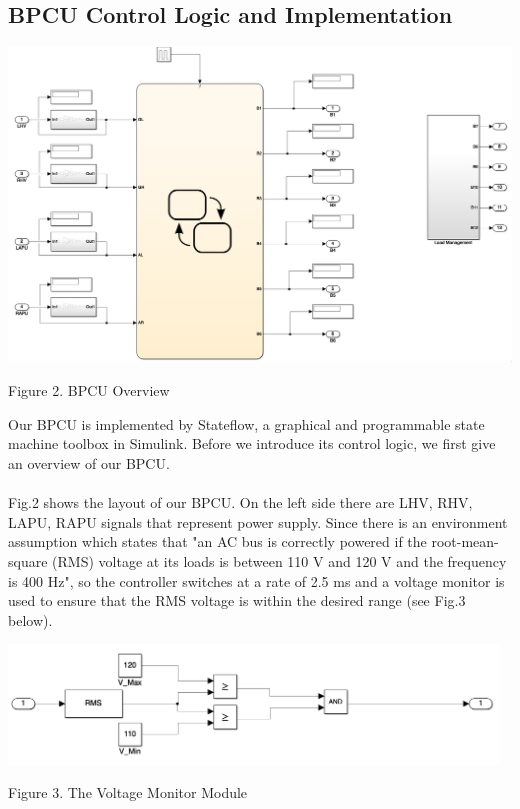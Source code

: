 \documentclass{mcmthesis}
\begin{document}
\subsection{BPCU Control Logic and Implementation}
\begin{center}
\includegraphics[width=15cm]{fig2.png}
\end{center}
\begin{center}
\small{Figure 2.  BPCU Overview}
\end{center}
Our BPCU is implemented by Stateflow, a graphical and programmable state machine toolbox in Simulink.  Before we introduce its control logic, we first give an overview of our BPCU.
\\
\\
Fig.2 shows the layout of our BPCU. On the left side there are LHV, RHV, LAPU, RAPU signals that represent power supply.  Since there is an environment assumption which states that "an AC bus is correctly powered if the root-mean-square (RMS) voltage at its loads is between 110 V and 120 V and the frequency is 400 Hz",  so the controller switches at a rate of 2.5 ms and a voltage monitor is used to ensure that the RMS voltage is within the desired range (see Fig.3 below).
\begin{center}
\includegraphics[width=13cm]{fig3.png}
\end{center}
\begin{center}
\small{Figure 3.  The Voltage Monitor Module}
\end{center}
\end{document}
